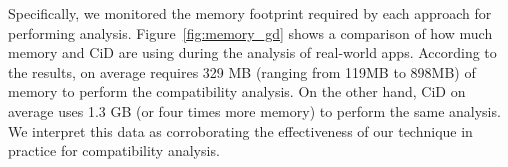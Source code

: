 Specifically, we monitored the memory footprint
required by each approach for performing analysis.
Figure~\ref{fig:memory_gd} shows a comparison of how
much memory \@approach and {\sc CiD} are using during
the analysis of real-world apps. According to the
results, \@approach on average requires 329 MB (ranging
from 119MB to 898MB) of memory to perform the
compatibility analysis. On the other hand, {\sc CiD} on
average uses 1.3 GB (or four times more memory) to
perform the same analysis.  We interpret this data as
corroborating  the effectiveness of our technique in
practice for compatibility analysis.


